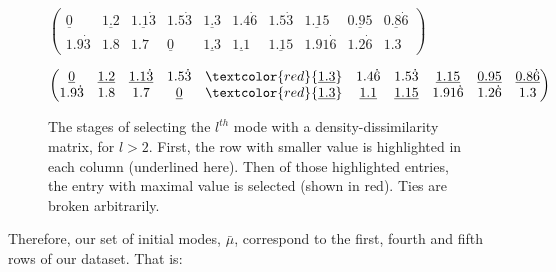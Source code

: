 \begin{example}
\begin{figure}[H]
{        \begin{minipage}{\textwidth}
            \centering
            \(
            \begin{pmatrix}
                \underline{0} & \underline{1.2} &
                \underline{1.1\dot{3}} & 1.5\dot{3} & \underline{1.3}
                & 1.4\dot{6} & 1.5\dot{3} & \underline{1.15} &
                \underline{0.95} & \underline{0.8\dot{6}}
                \\
                1.9\dot{3} & 1.8 & 1.7 & \underline{0} &
                \underline{1.3} & \underline{1.1} &
                \underline{1.15} & 1.91\dot{6} & 1.2\dot{6} & 1.3
            \end{pmatrix}
            \)
        \end{minipage}

        \vspace{10pt}

        \begin{minipage}{\textwidth}
            \centering
            \(
            \begin{pmatrix}
                \underline{0} & \underline{1.2} & \underline{1.1\dot{3}} &
                1.5\dot{3} & \textcolor{red}{\underline{1.3}} & 1.4\dot{6} &
                1.5\dot{3} & \underline{1.15} & \underline{0.95} &
                \underline{0.8\dot{6}}
                \\
                1.9\dot{3} & 1.8 & 1.7 & \underline{0} &
                \textcolor{red}{\underline{1.3}} & \underline{1.1} &
                \underline{1.15} & 1.91\dot{6} & 1.2\dot{6} & 1.3
            \end{pmatrix}
            \)
        \end{minipage}
        }
        \caption{The stages of selecting the \(l^{th}\) mode with a
        density-dissimilarity matrix, for \(l > 2\). First, the row with smaller
        value is highlighted in each column (underlined here). Then of those
        highlighted entries, the entry with maximal value is selected (shown in
    red). Ties are broken arbitrarily.}\label{fig:cao-matrix}
    \end{figure}

    Therefore, our set of initial modes, \(\bar{\mu}\), correspond to the first,
    fourth and fifth rows of our dataset. That is:
    
    
\end{example}

